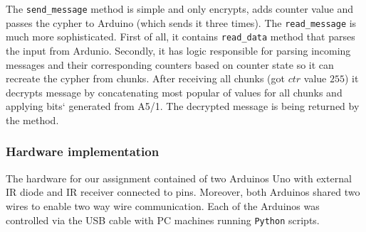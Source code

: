  The \texttt{send\_message} method is simple and only encrypts, adds counter value and passes the cypher to Arduino (which sends it three times). The \texttt{read\_message} is much more sophisticated. First of all, it contains \texttt{read\_data} method that parses the input from Ardunio. Secondly, it has logic responsible for parsing incoming messages and their corresponding counters based on counter state so it can recreate the cypher from chunks. After receiving all chunks (got $ctr$ value $255$) it decrypts message by concatenating most popular of values for all chunks and applying bits` generated from A5/1. The decrypted message is being returned by the method.

 \subsubsection{Hardware implementation}
The hardware for our assignment contained of two Arduinos Uno with external IR diode and IR receiver connected to pins. Moreover, both Arduinos shared two wires to enable two way wire communication. Each of the Arduinos was controlled via the USB cable with PC machines running \texttt{Python} scripts.